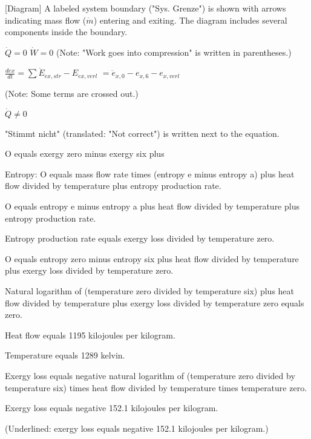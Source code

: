 [Diagram]  
A labeled system boundary ("Sys. Grenze") is shown with arrows indicating mass flow (\( \dot{m} \)) entering and exiting. The diagram includes several components inside the boundary.  

\( \dot{Q} = 0 \)  
\( \dot{W} = 0 \)  
(Note: "Work goes into compression" is written in parentheses.)  

\( \frac{d ex}{dt} = \sum \dot{E}_{ex,str} - E_{ex,verl} \)  
\( = \dot{e}_{x,0} - e_{x,6} - e_{x,verl} \)  

(Note: Some terms are crossed out.)  

\( \dot{Q} \neq 0 \)  

"Stimmt nicht" (translated: "Not correct") is written next to the equation.

O equals exergy zero minus exergy six plus  

Entropy: O equals mass flow rate times (entropy e minus entropy a) plus heat flow divided by temperature plus entropy production rate.  

O equals entropy e minus entropy a plus heat flow divided by temperature plus entropy production rate.  

Entropy production rate equals exergy loss divided by temperature zero.  

O equals entropy zero minus entropy six plus heat flow divided by temperature plus exergy loss divided by temperature zero.  

Natural logarithm of (temperature zero divided by temperature six) plus heat flow divided by temperature plus exergy loss divided by temperature zero equals zero.  

Heat flow equals 1195 kilojoules per kilogram.  

Temperature equals 1289 kelvin.  

Exergy loss equals negative natural logarithm of (temperature zero divided by temperature six) times heat flow divided by temperature times temperature zero.  

Exergy loss equals negative 152.1 kilojoules per kilogram.  

(Underlined: exergy loss equals negative 152.1 kilojoules per kilogram.)